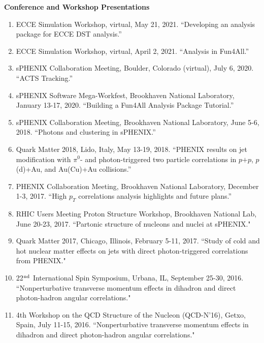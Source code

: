 \documentclass[11pt]{article}
\begin{document}

\begin{flushleft}
	\LARGE\textbf{Conference and Workshop Presentations} \\
	\normalsize
	\begin{enumerate}
		\item ECCE Simulation Workshop, virtual, May 21, 2021. ``Developing an analysis package for ECCE DST analysis.''
		\item ECCE Simulation Workshop, virtual, April 2, 2021. ``Analysis in Fun4All.''
		\item sPHENIX Collaboration Meeting, Boulder, Colorado (virtual), July 6, 2020. ``ACTS Tracking.''
		\item sPHENIX Software Mega-Workfest, Brookhaven National Laboratory, January 13-17, 2020. ``Building a Fun4All Analysis Package Tutorial.''
		\item sPHENIX Collaboration Meeting, Brookhaven National Laboratory, June 5-6, 2018. ``Photons and clustering in sPHENIX.''
		\item Quark Matter 2018, Lido, Italy, May 13-19, 2018. ``PHENIX results on jet modification with $\pi^0$- and photon-triggered two particle correlations in $p$$+$$p$, $p$(d)+Au, and Au(Cu)+Au collisions.''
		
		\item PHENIX Collaboration Meeting, Brookhaven National Laboratory, December 1-3, 2017. ``High $p_T$ correlations analysis highlights and future plans.''
		
		\item RHIC Users Meeting Proton Structure Workshop, Brookhaven National Lab, June 20-23, 2017. ``Partonic structure of nucleons and nuclei at sPHENIX."
		
		\item Quark Matter 2017, Chicago, Illinois, February 5-11, 2017. ``Study of cold and hot nuclear matter effects on jets with direct photon-triggered correlations from PHENIX."
		
		
		\item 22$^{\rm nd}$ International Spin Symposium, Urbana, IL, September 25-30, 2016. ``Nonperturbative transverse momentum effects in dihadron and direct photon-hadron angular correlations."
		
		\item 4th Workshop on the QCD Structure of the Nucleon (QCD-N'16), Getxo, Spain, July 11-15, 2016. ``Nonperturbative transverse momentum effects in dihadron and direct photon-hadron angular correlations."
		

\end{enumerate}
\end{flushleft}
\end{document}
